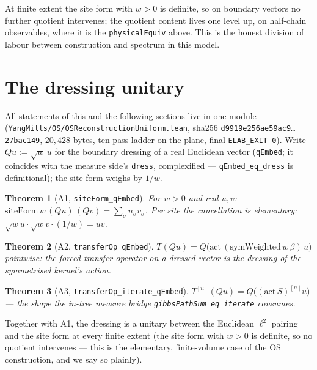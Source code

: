 \documentclass[11pt]{article}
\newtheorem{theorem}{Theorem}[section]
\newcommand{\lean}[1]{\texttt{#1}}
\begin{document}
At finite extent the site form with $w > 0$ is definite, so on
boundary vectors no further quotient intervenes; the quotient content
lives one level up, on half-chain observables, where it is the
\lean{physicalEquiv} above.  This is the honest division of labour
between construction and spectrum in this model.

\section{The dressing unitary}\label{sec:unitary}
All statements of this and the following sections live in one module
(\lean{YangMills/OS/OSReconstructionUniform.lean}, sha256
\lean{d9919e256ae59ac9\ldots27bac149}, $20{,}428$ bytes, ten-pass
ladder on the plane, final \lean{ELAB\_EXIT 0}).  Write
$Qu := \sqrt{w}\,u$ for the boundary dressing of a real Euclidean
vector (\lean{qEmbed}; it coincides with the measure side's
\lean{dress}, complexified --- \lean{qEmbed\_eq\_dress} is
definitional); the site form weighs by $1/w$.

\begin{theorem}[A1, \lean{siteForm\_qEmbed}]
For $w > 0$ and real $u, v$:
$\mathrm{siteForm}\,w\,(Qu)\,(Qv) = \sum_\sigma u_\sigma v_\sigma$.
Per site the cancellation is elementary:
$\sqrt{w}u \cdot \sqrt{w}v \cdot (1/w) = uv$.
\end{theorem}

\begin{theorem}[A2, \lean{transferOp\_qEmbed}]
$T(Qu) = Q\big(\mathrm{act}\,(\mathrm{symWeighted}\,w\,\beta)\,u\big)$
pointwise: the forced transfer operator on a dressed vector is the
dressing of the symmetrised kernel's action.
\end{theorem}

\begin{theorem}[A3, \lean{transferOp\_iterate\_qEmbed}]
$T^{[n]}(Qu) = Q\big((\mathrm{act}\,S)^{[n]} u\big)$ --- the shape the
in-tree measure bridge \lean{gibbsPathSum\_eq\_iterate} consumes.
\end{theorem}

Together with A1, the dressing is a unitary between the Euclidean
$\ell^2$ pairing and the site form at every finite extent (the site
form with $w>0$ is definite, so no quotient intervenes --- this is the
elementary, finite-volume case of the OS construction, and we say so
plainly).
\end{document}
